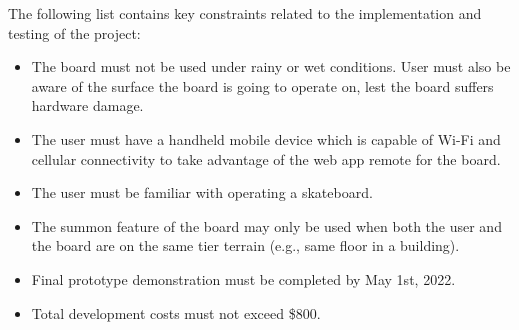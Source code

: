 The following list contains key constraints related to the implementation and testing of the project:

\begin{itemize}
  \item The board must not be used under rainy or wet conditions. User must also be aware of the surface the board is going to operate on, lest the board suffers hardware damage. 
  \item The user must have a handheld mobile device which is capable of Wi-Fi and cellular connectivity to take advantage of the web app remote for the board. 
  \item The user must be familiar with operating a skateboard.
  \item The summon feature of the board may only be used when both the user and the board are on the same tier terrain (e.g., same floor in a building). 
  \item Final prototype demonstration must be completed by May 1st, 2022.
  \item Total development costs must not exceed \$800.
\end{itemize}